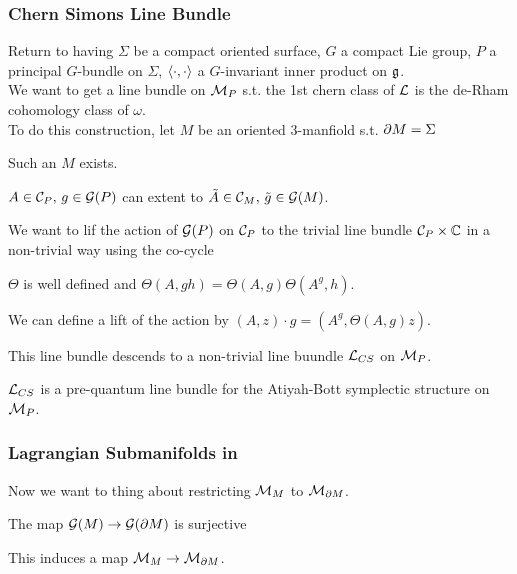 \documentclass{article}
\begin{document}
\subsubsection{Chern Simons Line Bundle}
Return to having $\Sigma$ be a compact oriented surface, $G$ a compact Lie group, $P$ a principal $G$-bundle on $\Sigma$, $\left\langle \cdot,\cdot \right\rangle$ a $G$-invariant inner product on $\mathfrak{g}$. \\
We want to get a line bundle on $\mathcal{M}_P$ s.t. the 1st chern class of $\mathcal{L}$ is the de-Rham cohomology class of $\omega$. \\
To do this construction, let $M$ be an oriented 3-manfiold s.t. $\partial M = \Sigma$ 
\begin{lemma}
	Such an $M$ exists. 
\end{lemma}
\begin{lemma}
	$A \in \mathcal{C}_P, \, g \in \mathcal{G}(P)$ can extent to $\tilde{A} \in \mathcal{C}_M, \, \tilde{g} \in \mathcal{G}(M)$. 
\end{lemma}
We want to lif the action of $\mathcal{G}(P)$ on $\mathcal{C}_P$ to the trivial line bundle $\mathcal{C}_P \times \mathbb{C}$ in a non-trivial way using the co-cycle
\begin{prop}
	$\Theta$ is well defined and $\Theta(A,gh) = \Theta(A,g)\Theta(A^g,h)$. 
\end{prop}
\begin{corollary}
	We can define a lift of the action by $(A,z) \cdot g = (A^g,\Theta(A,g)z)$. 
\end{corollary}
This line bundle descends to a non-trivial line buundle $\mathcal{L}_{CS}$ on $\mathcal{M}_P$. 
\begin{prop}
	$\mathcal{L}_{CS}$ is a pre-quantum line bundle for the Atiyah-Bott symplectic structure on $\mathcal{M}_P$. 
\end{prop}

\subsubsection{Lagrangian Submanifolds in }
Now we want to thing about restricting $\mathcal{M}_M$ to $\mathcal{M}_{\partial M}$. 
\begin{lemma}
	The map $\mathcal{G}(M) \to \mathcal{G}(\partial M)$ is surjective
\end{lemma}
\begin{corollary}
	This induces a map $\mathcal{M}_M \to \mathcal{M}_{\partial M}$.
\end{corollary}
\end{document}
